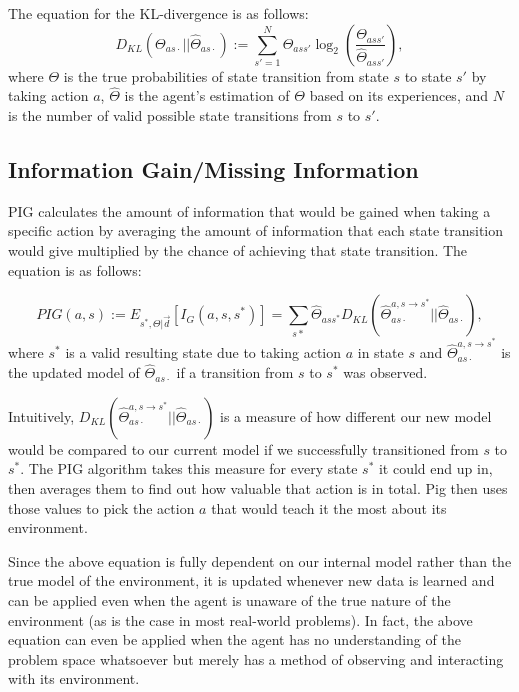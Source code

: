 \documentclass[12pt]{thesis}
\begin{document}
The equation for the KL-divergence is as follows:
\[D_{KL} (\Theta_{as\cdot} || \hat{\Theta}_{as\cdot}) := \sum_{s' = 1}^{ N} \Theta_{ass'} \log_{2}\left(\frac{\Theta_{ass'}}{\hat{\Theta}_{ass'}}\right), \]
where $\Theta$ is the true probabilities of state transition from state $s$ to state $s'$ by taking action $a$, $\hat{\Theta}$ is the agent's estimation of $\Theta$ based on its experiences, and $N$ is the number of valid possible state transitions from $s$ to $s'$.

\subsection{Information Gain/Missing Information}
PIG calculates the amount of information that would be gained when taking a specific action by averaging the amount of information that each state transition would give multiplied by the chance of achieving that state transition. The equation is as follows:

\[ PIG(a,s) := E_{s^{*},\Theta|\vec{d}} \left[I_{G}(a,s,s^{*})\right] = \sum_{s*} \hat{\Theta}_{ass^{*}}D_{KL}(\hat{\Theta}_{as\cdot}^{a,s \rightarrow s^{*}} || \hat{\Theta}_{as\cdot}), \]
where $s^{*}$ is a valid resulting state due to taking action $a$ in state $s$ and $\hat{\Theta}_{as\cdot}^{a,s \rightarrow s^{*}}$ is the updated model of $\hat{\Theta}_{as\cdot}$ if a transition from $s$ to $s^{*}$ was observed.

Intuitively, $D_{KL}(\hat{\Theta}_{as\cdot}^{a,s \rightarrow s^{*}} || \hat{\Theta}_{as\cdot})$ is a measure of how different our new model would be compared to our current model if we successfully transitioned from $s$ to $s^{*}$. The PIG algorithm takes this measure for every state $s^{*}$ it could end up in, then averages them to find out how valuable that action is in total. Pig then uses those values to pick the action $a$ that would teach it the most about its environment.

Since the above equation is fully dependent on our internal model rather than the true model of the environment, it is updated whenever new data is learned and can be applied even when the agent is unaware of the true nature of the environment (as is the case in most real-world problems). In fact, the above equation can even be applied when the agent has no understanding of the problem space whatsoever but merely has a method of observing and interacting with its environment.
\end{document}
